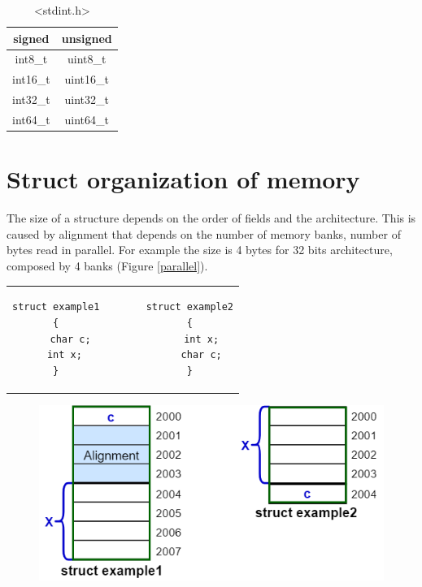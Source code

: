 \begin{table}[h]
\centering
\begin{tabular}{|c|c|}
\hline
\textbf{signed}&{unsigned}\\
\hline
{int8\_t}&{uint8\_t}\\
{int16\_t}&{uint16\_t}\\
{int32\_t}&{uint32\_t}\\
{int64\_t}&{uint64\_t}\\
\hline
\end{tabular}\caption{<stdint.h>}
\end{table}
\vspace{4cm}
\section{Struct organization of memory}
The size of a structure depends on the order of fields and the architecture. This is caused by alignment that depends on the number of memory banks, number of bytes read in parallel. For example the size is 4 bytes for 32 bits architecture, composed by 4 banks (Figure \ref{parallel}).
\begin{center}
\begin{tabular}{c}
\begin{lstlisting}[linewidth=200pt, basicstyle=\footnotesize\sffamily,]
struct example1        struct example2
{                      {
	char c;	               int x;
	int x;	               char c;
}                      }
\end{lstlisting}
\end{tabular}
\end{center}

\begin{figure}[h]
\centering
\includegraphics[scale=0.5]{Images/Programming/struct}
\end{figure}

